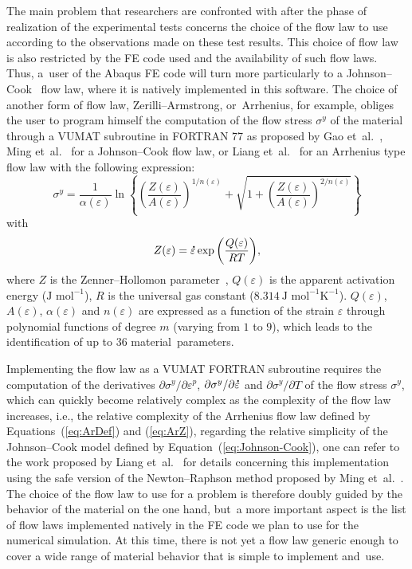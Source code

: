 \documentclass[algorithms,article,accept,pdftex,oneauthors]{Definitions/mdpi}
\makeatletter
\DeclareRobustCommand{\mdot}[1]{\accentset{\mbox{\bfseries .}}{#1}}
\DeclareRobustCommand{\ie}{{i.e.,}\@\xspace}
\makeatother
\begin{document}
The main problem that researchers are confronted with after the phase of realization of the experimental tests concerns the choice of the flow law to use according to the observations made on these test results.
This choice of flow law is also restricted by the FE code used and the availability of such flow laws.
Thus, a~user of the Abaqus FE code will turn more particularly to a Johnson--Cook~\cite{Johnson-1983} flow law, where it is natively implemented in this software.
The choice of another form of flow law, Zerilli--Armstrong, or~Arrhenius, for example, obliges the user to program himself the computation of the flow stress $\sigma^y$ of the material through a VUMAT subroutine in FORTRAN 77 as proposed by Gao et~al.~\cite{Gao-2007-FRT}, Ming et~al.~\cite{Ming-2018} for a Johnson--Cook flow law, or Liang et~al.~\cite{Liang-2022} for an Arrhenius type flow law with the following expression:
\begin{equation}
\sigma^y = \frac{1}{\alpha(\varepsilon)} \ln\left\{\left(\frac{Z(\varepsilon)}{A(\varepsilon)}\right)^{1/n(\varepsilon)} + \sqrt{1 + \left(\frac{Z(\varepsilon)}{A(\varepsilon)}\right)^{2/n(\varepsilon)}}\right\}
\label{eq:ArDef}
\end{equation}
with
\begin{equation}
Z(\varepsilon) = \mdot\varepsilon \exp{\left(\frac{Q(\varepsilon)}{RT}\right)}, \label{eq:ArZ}
\end{equation}
where $Z$ is the Zenner--Hollomon parameter~\cite{Zener-1944}, $Q(\varepsilon)$ is the apparent activation energy ($\text{J~mol}^{-1}$), $R$ is the universal gas constant ($8.314~\text{J~mol}^{-1} \text{K}^{-1}$).
$Q(\varepsilon)$, $A(\varepsilon)$, $\alpha(\varepsilon)$ and $n(\varepsilon)$ are expressed as a function of the strain $\varepsilon$ through polynomial functions of degree $m$ (varying from $1$ to $9$), which leads to the identification of up to $36$ material~parameters.

Implementing the flow law as a VUMAT FORTRAN subroutine requires the computation of the derivatives  $\partial\sigma^y/\partial\varepsilon^p$, $\partial\sigma^y/\partial\mdot\varepsilon$ and $\partial\sigma^y/\partial T$ of the flow stress $\sigma^y$, which can quickly become relatively complex as the complexity of the flow law increases, \ie the relative complexity of the Arrhenius flow law defined by Equations~(\ref{eq:ArDef}) and (\ref{eq:ArZ}), regarding the relative simplicity of the Johnson--Cook model defined by Equation~(\ref{eq:Johnson-Cook}), one can refer to the work proposed by Liang et~al.~\cite{Liang-2022} for details concerning this implementation using the safe version of the Newton--Raphson method proposed by Ming et~al.~\cite{Ming-2018}.
The choice of the flow law to use for a problem is therefore doubly guided by the behavior of the material on the one hand, but~a more important aspect is the list of flow laws implemented natively in the FE code we plan to use for the numerical simulation.
At this time, there is not yet a flow law generic enough to cover a wide range of material behavior that is simple to implement and~use.
\end{document}
